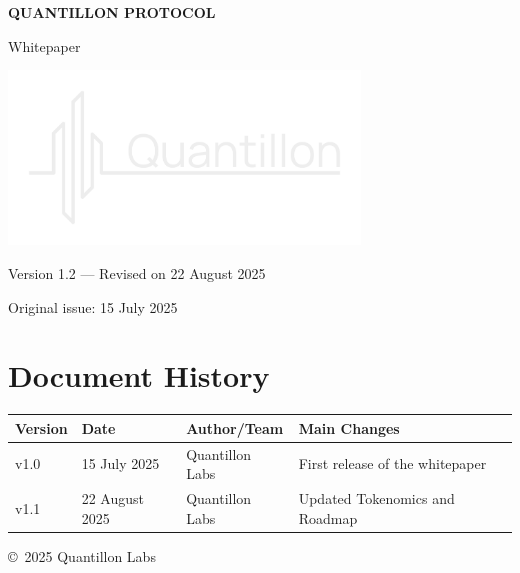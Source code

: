 \documentclass[12pt,a4paper]{report}
\begin{document}
\begin{titlepage}
  \centering
  {\huge\bfseries QUANTILLON PROTOCOL\par}
  \vspace{1em}
  {\Large Whitepaper\par}
  \vspace{2em}
  \includegraphics[width=0.7\textwidth]{media/image1.png}\par
  \vfill
  {\large Version 1.2 — Revised on 22 August 2025\par}
  {\large Original issue: 15 July 2025\par}
\end{titlepage}

\section*{Document History}
\begin{tabularx}{\textwidth}{@{} l l l X @{} }
\toprule
\textbf{Version} & \textbf{Date} & \textbf{Author/Team} & \textbf{Main Changes} \\
\midrule
v1.0 & 15 July 2025 & Quantillon Labs & First release of the whitepaper \\
v1.1 & 22 August 2025 & Quantillon Labs & Updated Tokenomics and Roadmap \\
\bottomrule
\end{tabularx}
\newpage

\tableofcontents
\newpage



\vfill
\begin{center}
  \small \copyright~2025 Quantillon Labs
\end{center}
\end{document}
